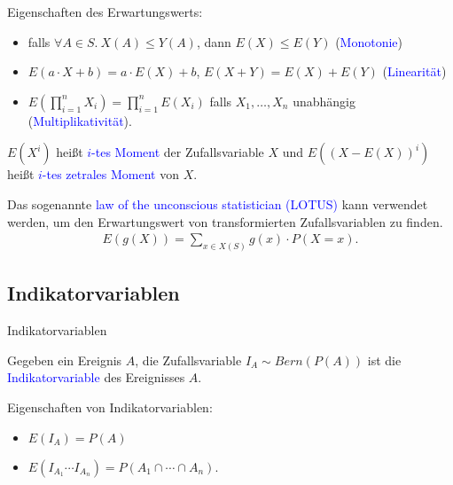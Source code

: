 \documentclass{beamer}
\def\padding{\vspace{0.5cm}}
\def\b{\textcolor{blue}}
\begin{document}
\begin{frame}
    Eigenschaften des Erwartungswerts:\pause
    \begin{itemize}
        \item falls $\forall A \in S.\ X(A) \leq Y(A)$, dann $E(X) \leq E(Y)$ (\b{Monotonie})\pause
        \item $E(a \cdot X + b) = a \cdot E(X) + b$, $E(X + Y) = E(X) + E(Y)$ (\b{Linearität})\pause
        \item $E(\prod_{i=1}^n X_i) = \prod_{i=1}^n E(X_i)$ falls $X_1, \dots, X_n$ unabhängig (\b{Multiplikativität}).
    \end{itemize}
\end{frame}

\begin{frame}
    \begin{definition}
        $E(X^i)$ heißt \b{$i$-tes Moment} der Zufallsvariable $X$ und $E((X - E(X))^i)$ heißt \b{$i$-tes zetrales Moment} von $X$.
    \end{definition}
\end{frame}

\begin{frame}
    Das sogenannte \b{law of the unconscious statistician (LOTUS)} kann verwendet werden, um den Erwartungswert von transformierten Zufallsvariablen zu finden.
    \begin{align*}
        E(g(X)) = \sum_{x \in X(S)} g(x) \cdot P(X = x).
    \end{align*}
\end{frame}

\subsection{Indikatorvariablen}
\begin{frame}{Indikatorvariablen}
    \begin{definition}
        Gegeben ein Ereignis $A$, die Zufallsvariable $I_A \sim Bern(P(A))$ ist die \b{Indikatorvariable} des Ereignisses $A$.
    \end{definition}\pause\par\padding
    Eigenschaften von Indikatorvariablen:\pause
    \begin{itemize}
        \item $E(I_A) = P(A)$\pause
        \item $E(I_{A_1} \cdots I_{A_n}) = P(A_1 \cap \cdots \cap A_n)$.
    \end{itemize}
\end{frame}
\end{document}
